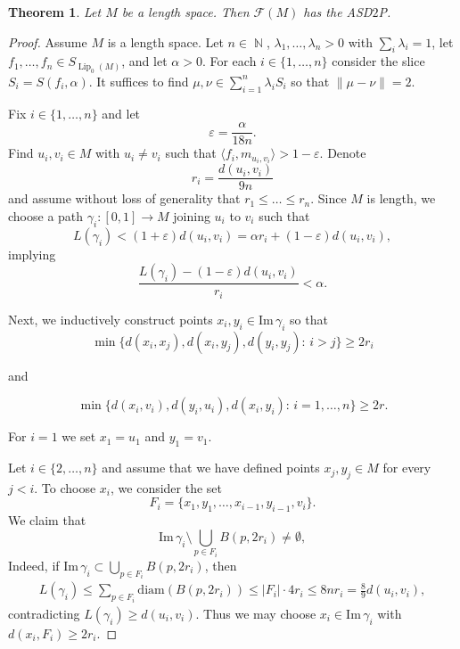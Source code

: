 \documentclass[a4paper,12pt]{amsart}
\theoremstyle{plain}
\newtheorem{thm}{Theorem}[section]
\theoremstyle{definition}
\theoremstyle{remark}
\numberwithin{equation}{section}
\DeclareMathOperator{\Lip}{Lip}
\DeclareMathOperator{\N}{\mathbb{N}}
\begin{document}
\begin{thm}\label{thm:ASD2P_main}
    Let $M$ be a length space. Then $\mathcal{F}(M)$ has the ASD$2$P. 
\end{thm}
\begin{proof}
Assume $M$ is a length space. 
    Let $n\in \N$, $\lambda_1,\ldots,\lambda_n>0$ with $\sum_i\lambda_i=1$,
    let $f_1,\ldots,f_n\in S_{\Lip_0(M)}$, and let $\alpha>0$. For each $i\in \{1,\ldots,n\}$ consider the slice $S_i=S(f_i,\alpha)$. It suffices to find $\mu,\nu\in \sum_{i=1}^n \lambda_iS_i$ so that $\|\mu-\nu\|=2$.


Fix $i\in \{1,\ldots,n\}$ and let 
\[\varepsilon=\frac{\alpha}{18n}.\]  
Find $u_i,v_i\in M$ with $u_i\neq v_i$ such that
$\langle f_i,m_{u_i,v_i}\rangle>1-\varepsilon$. Denote
\[
r_i=\frac{d(u_i,v_i)}{9n}
\]
and assume without loss of generality that $r_1\leq\ldots\leq r_n$. 
Since $M$ is length, we choose a path $\gamma_i:[0,1]\to M$ joining $u_i$ to $v_i$
such that
\[L(\gamma_i)<(1+\varepsilon)d(u_i,v_i)=\alpha r_i+(1-\varepsilon)d(u_i,v_i),\]
implying
\begin{equation}
\frac{L(\gamma_i)-(1-\varepsilon)d(u_i,v_i)}{r_i}<\alpha.
\end{equation}


Next, we inductively construct points $x_i,y_i\in\mathrm{Im}\,\gamma_i$
so that
\begin{equation}
\min\{d(x_i,x_j),d(x_i,y_j),d(y_i,y_j):\, i>j\}\ge 2r_i
\end{equation}

and

\begin{equation}\tag{2.3}
\min\{d(x_i,v_i),d(y_i,u_i),d(x_i,y_i):\, i=1,\dots,n\}\ge 2r.
\end{equation}

For $i=1$ we set $x_1=u_1$ and $y_1=v_1$.

Let $i\in \{2,\ldots,n\}$ and assume that we have defined points $x_j,y_j\in M$ for every $j<i$. 
To choose $x_i$, we consider the set
\[
F_i=\{x_1,y_1,\dots,x_{i-1},y_{i-1},v_i\}.
\]
We claim that
\[
\mathrm{Im}\,\gamma_i
\setminus\bigcup_{p\in F_i} B(p,2r_i)
\neq\emptyset,
\]
Indeed, if $\mathrm{Im}\,\gamma_i\subset \bigcup_{p\in F_i}B(p,2r_i)$, then
\begin{align*}
 L(\gamma_i)
\le \sum_{p\in F_i}\mathrm{diam}(B(p,2r_i))
\le |F_i|\cdot 4r_i
\le
8nr_i
= \frac89 d(u_i,v_i),
\end{align*}
contradicting $L(\gamma_i)\geq d(u_i,v_i)$.
Thus we may choose $x_i\in\mathrm{Im}\,\gamma_i$
with $d(x_i,F_i)\ge 2r_i$.


\end{proof}
\end{document}
